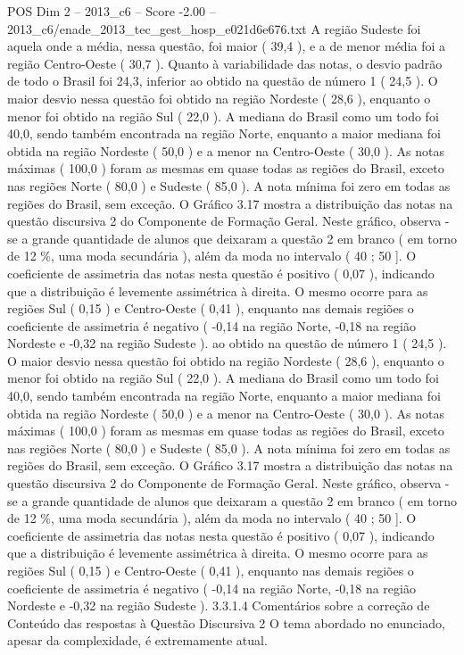 \begin{textsample}{POS Dim 2 – 2013\_c6 – Score -2.00 – 2013\_c6/enade\_2013\_tec\_gest\_hosp\_e021d6e676.txt}
A região Sudeste foi aquela onde a média, nessa questão, foi maior ( 39,4 ), e a de menor média foi a região Centro-Oeste ( 30,7 ).
Quanto à variabilidade das notas, o desvio padrão de todo o Brasil foi 24,3, inferior ao obtido na questão de número 1 ( 24,5 ).
O maior desvio nessa questão foi obtido na região Nordeste ( 28,6 ), enquanto o menor foi obtido na região Sul ( 22,0 ).
A mediana do Brasil como um todo foi 40,0, sendo também encontrada na região Norte, enquanto a maior mediana foi obtida na região Nordeste ( 50,0 ) e a menor na Centro-Oeste ( 30,0 ).
As notas máximas ( 100,0 ) foram as mesmas em quase todas as regiões do Brasil, exceto nas regiões Norte ( 80,0 ) e Sudeste ( 85,0 ).
A nota mínima foi zero em todas as regiões do Brasil, sem exceção.
O Gráfico 3.17 mostra a distribuição das notas na questão discursiva 2 do Componente de Formação Geral.
Neste gráfico, observa -se a grande quantidade de alunos que deixaram a questão 2 em branco ( em torno de 12 \%, uma moda secundária ), além da moda no intervalo ( 40 ; 50 ].
O coeficiente de assimetria das notas nesta questão é positivo ( 0,07 ), indicando que a distribuição é levemente assimétrica à direita.
O mesmo ocorre para as regiões Sul ( 0,15 ) e Centro-Oeste ( 0,41 ), enquanto nas demais regiões o coeficiente de assimetria é negativo ( -0,14 na região Norte, -0,18 na região Nordeste e -0,32 na região Sudeste ). ao obtido na questão de número 1 ( 24,5 ).
O maior desvio nessa questão foi obtido na região Nordeste ( 28,6 ), enquanto o menor foi obtido na região Sul ( 22,0 ).
A mediana do Brasil como um todo foi 40,0, sendo também encontrada na região Norte, enquanto a maior mediana foi obtida na região Nordeste ( 50,0 ) e a menor na Centro-Oeste ( 30,0 ).
As notas máximas ( 100,0 ) foram as mesmas em quase todas as regiões do Brasil, exceto nas regiões Norte ( 80,0 ) e Sudeste ( 85,0 ).
A nota mínima foi zero em todas as regiões do Brasil, sem exceção.
O Gráfico 3.17 mostra a distribuição das notas na questão discursiva 2 do Componente de Formação Geral.
Neste gráfico, observa -se a grande quantidade de alunos que deixaram a questão 2 em branco ( em torno de 12 \%, uma moda secundária ), além da moda no intervalo ( 40 ; 50 ].
O coeficiente de assimetria das notas nesta questão é positivo ( 0,07 ), indicando que a distribuição é levemente assimétrica à direita.
O mesmo ocorre para as regiões Sul ( 0,15 ) e Centro-Oeste ( 0,41 ), enquanto nas demais regiões o coeficiente de assimetria é negativo ( -0,14 na região Norte, -0,18 na região Nordeste e -0,32 na região Sudeste ). 3.3.1.4 Comentários sobre a correção de Conteúdo das respostas à Questão Discursiva 2 O tema abordado no enunciado, apesar da complexidade, é extremamente atual.

\end{textsample}

